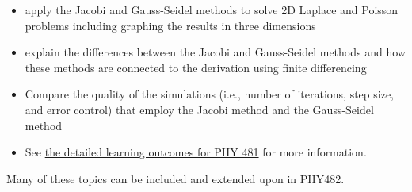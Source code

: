 \begin{itemize}
\item apply the Jacobi and Gauss-Seidel methods to solve 2D Laplace and Poisson problems including graphing the results in three dimensions

\item explain the differences between the Jacobi and Gauss-Seidel methods and how these methods are connected to the derivation using finite differencing

\item Compare the quality of the simulations (i.e., number of iterations, step size, and error control) that employ the Jacobi method and the Gauss-Seidel method

\item See \href{{https://dannycab.github.io/phy481msu/learning_goals.html}}{the detailed learning outcomes for PHY 481} for more information.
\end{itemize}

\noindent
Many of these topics can be included and extended upon in PHY482.


